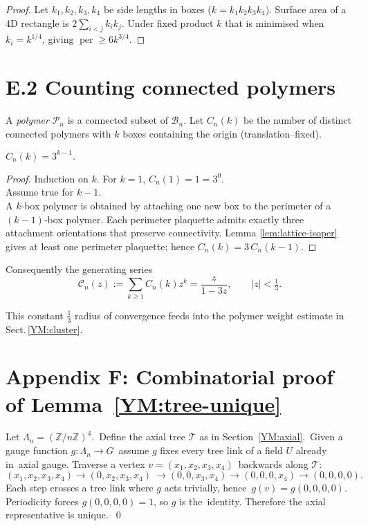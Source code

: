 \begin{proof}
Let $k_{1},k_{2},k_{3},k_{4}$ be side lengths in boxes
($k=k_{1}k_{2}k_{3}k_{4}$).  Surface area of a 4D rectangle is
\(2\sum_{i<j}k_{i}k_{j}.\)  Under fixed product $k$ that is minimised
when $k_{i}=k^{1/4}$, giving
\(\operatorname{per}\ge 6k^{3/4}.\)
\end{proof}

\bigskip
\section*{E.2  Counting connected polymers}

A \emph{polymer} $\mathcal P_{n}$ is a connected subset of $\mathscr B_{n}$.
Let $C_{n}(k)$ be the number of distinct connected polymers with $k$
boxes containing the origin (translation–fixed).

\begin{proposition}\label{prop:count}
\(
C_{n}(k)=3^{k-1}.
\)
\end{proposition}

\begin{proof}
Induction on $k$.  For $k=1$, $C_{n}(1)=1=3^{0}$.  \\
Assume true for $k-1$.  \\
A $k$‐box polymer is obtained by attaching one new box to the perimeter
of a $(k-1)$‐box polymer.  Each perimeter plaquette admits exactly
three attachment orientations that preserve connectivity.  Lemma
\ref{lem:lattice-isoper} gives at least one perimeter plaquette; hence
\(C_{n}(k)=3\,C_{n}(k-1).\)
\end{proof}

Consequently the generating series
\[
\mathcal C_{n}(z):=\sum_{k\ge1}C_{n}(k)z^{k}
  =\frac{z}{1-3z},\qquad |z|<\tfrac13 .
\]

This constant $\tfrac13$ radius of convergence feeds into the polymer
weight estimate in Sect.\,\ref{YM:cluster}.

\section{Appendix F: Combinatorial proof of Lemma~\ref{YM:tree-unique}}

Let $\Lambda_{n}=(\mathbb Z/n\mathbb Z)^{4}$.\
Define the axial tree $\mathcal T$ as in Section~\ref{YM:axial}.\
Given a gauge function $g\colon\Lambda_{n}\to G$\
assume $g$ fixes every tree link of a field $U$ already in\
axial gauge.  Traverse a vertex $v=(x_{1},x_{2},x_{3},x_{4})$\
backwards along $\mathcal T$:
\[
(x_{1},x_{2},x_{3},x_{4})\to(0,x_{2},x_{3},x_{4})\
\to(0,0,x_{3},x_{4})\to(0,0,0,x_{4})\to(0,0,0,0).
\]
Each step crosses a tree link where $g$ acts trivially, hence\
$g(v)=g(0,0,0,0)$.  Periodicity forces $g(0,0,0,0)=1$, so $g$ is the\
identity.  Therefore the axial representative is unique.\
\qed 